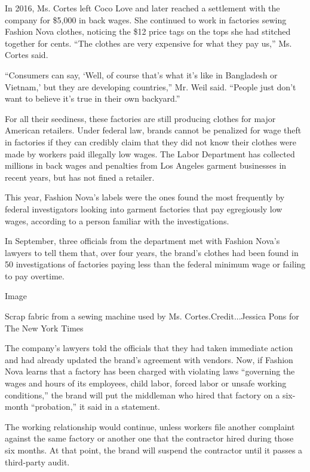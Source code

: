 In 2016, Ms. Cortes left Coco Love and later reached a settlement with
the company for \$5,000 in back wages. She continued to work in
factories sewing Fashion Nova clothes, noticing the \$12 price tags on
the tops she had stitched together for cents. ``The clothes are very
expensive for what they pay us,'' Ms. Cortes said.

``Consumers can say, `Well, of course that's what it's like in
Bangladesh or Vietnam,' but they are developing countries,'' Mr. Weil
said. ``People just don't want to believe it's true in their own
backyard.''

For all their seediness, these factories are still producing clothes for
major American retailers. Under federal law, brands cannot be penalized
for wage theft in factories if they can credibly claim that they did not
know their clothes were made by workers paid illegally low wages. The
Labor Department has collected millions in back wages and penalties from
Los Angeles garment businesses in recent years, but has not fined a
retailer.

This year, Fashion Nova's labels were the ones found the most frequently
by federal investigators looking into garment factories that pay
egregiously low wages, according to a person familiar with the
investigations.

In September, three officials from the department met with Fashion
Nova's lawyers to tell them that, over four years, the brand's clothes
had been found in 50 investigations of factories paying less than the
federal minimum wage or failing to pay overtime.

Image

Scrap fabric from a sewing machine used by Ms. Cortes.Credit...Jessica
Pons for The New York Times

The company's lawyers told the officials that they had taken immediate
action and had already updated the brand's agreement with vendors. Now,
if Fashion Nova learns that a factory has been charged with violating
laws ``governing the wages and hours of its employees, child labor,
forced labor or unsafe working conditions,'' the brand will put the
middleman who hired that factory on a six-month ``probation,'' it said
in a statement.

The working relationship would continue, unless workers file another
complaint against the same factory or another one that the contractor
hired during those six months. At that point, the brand will suspend the
contractor until it passes a third-party audit.

